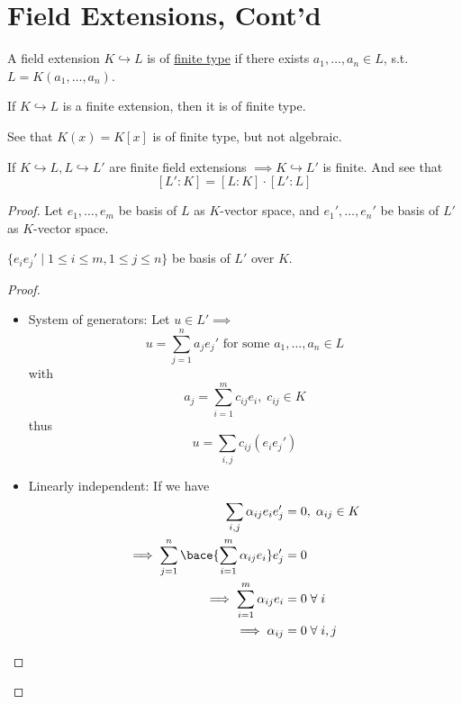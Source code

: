 \section{Field Extensions, Cont'd}

\begin{definition}
	A field extension \( K \hookrightarrow L \) is of \underline{finite type} if there exists \(
	a_1,\ldots, a_n \in L \), s.t. \( L = K(a_1,\ldots,a_n) \).
\end{definition}

\begin{proposition}
	If \( K \hookrightarrow L \) is a finite extension, then it is of finite type.
\end{proposition}

\begin{eg}
	See that \( K(x) = K[x] \) is of finite type, but not algebraic.
\end{eg}

\begin{proposition}
	\label{prop:finite-extension-is-finite-type}
	If \( K \hookrightarrow L, L \hookrightarrow L' \) are finite field extensions \( \implies K
	\hookrightarrow L' \) is finite. And see that
	\[
		[L': K] = [L:K] \cdot [L':L]
	\]
\end{proposition}

\begin{proof}
	Let \( e_1,\ldots, e_m \) be basis of \( L \) as \( K \)-vector space, and \( e_1',\ldots,e_n' \)
	be basis of \( L' \) as \( K \)-vector space.

	\begin{claim}
		\( \{e_i e_j' \; | \; 1 \leq i \leq m, 1\leq j \leq n\} \) be basis of \( L' \) over \( K \).
	\end{claim}

	\begin{proof}
		\leavevmode
		\begin{itemize}
			\item System of generators: Let \( u \in L' \implies \)
			      \[
				      u = \sum_{j=1}^n a_j e_j' \text{ for some } a_1,\ldots, a_n \in L
			      \]
			      with
			      \[
				      a_j = \sum_{i=1}^m c_{ij} e_i, \; c_{ij} \in K
			      \]
			      thus
			      \[
				      u = \sum_{i,j} c_{ij}(e_i e_j')
			      \]
			\item Linearly independent: If we have
			      \[
				      \begin{aligned}
					      \sum_{i,j}\alpha_{ij}e_ie_j'                                  & = 0, \; \alpha_{ij} \in K \\
					      \implies \sum_{j=1}^n \bace{\sum_{i=1}^m \alpha_{ij}e_i} e_j' & = 0                       \\
					      \implies \sum_{i=1}^m \alpha_{ij} e_i                         & = 0 \; \forall \; i       \\
					      \implies \alpha_{ij}                                          & = 0 \; \forall \; i,j
				      \end{aligned}
			      \]
		\end{itemize}
	\end{proof}
\end{proof}

